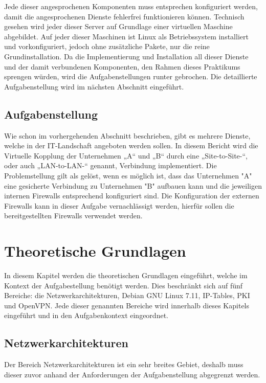 \documentclass[
a4paper,     %
 headsepline, %
footsepline, %
titlepage,   %
 halfparskip,     %
 fleqn,       %
12pt         %
]{scrartcl}  %
\begin{document}
Jede dieser angesprochenen Komponenten muss entsprechen konfiguriert werden, damit die angesprochenen Dienste fehlerfrei funktionieren können.
Technisch gesehen wird jeder dieser Server auf Grundlage einer virtuellen Maschine abgebildet.
Auf jeder dieser Maschinen ist Linux als Betriebssystem installiert und vorkonfiguriert, jedoch ohne zusätzliche Pakete, nur die reine Grundinstallation. Da die Implementierung und Installation all dieser Dienste und der damit verbundenen Komponenten, den Rahmen dieses Praktikums sprengen würden, wird die Aufgabenstellungen runter gebrochen. Die detaillierte Aufgabenstellung wird im nächsten Abschnitt eingeführt.

\subsection{Aufgabenstellung}\label{kap:Aufgabenstellung}
Wie schon im vorhergehenden Abschnitt beschrieben, gibt es mehrere Dienste, welche in der IT-Landschaft angeboten werden sollen. 
In diesem Bericht wird die Virtuelle Kopplung der Unternehmen „A“ und „B“ durch eine „Site-to-Site-“, oder auch „LAN-to-LAN-“ genannt, Verbindung implementiert. 
Die Problemstellung gilt als gelöst, wenn es möglich ist, dass das Unternehmen "A" eine gesicherte Verbindung zu Unternehmen "B" aufbauen kann und die jeweiligen internen Firewalls entsprechend konfiguriert sind. Die Konfiguration der externen Firewalls kann in dieser Aufgabe vernachlässigt werden, hierfür sollen die bereitgestellten Firewalls verwendet werden. 

\section{Theoretische Grundlagen}
In diesem Kapitel werden die theoretischen Grundlagen eingeführt, welche im Kontext der Aufgabestellung benötigt werden. Dies beschränkt sich auf fünf Bereiche: die Netzwerkarchitekturen, Debian GNU Linux 7.11, IP-Tables, PKI und OpenVPN. Jede dieser genannten Bereiche wird innerhalb dieses Kapitels eingeführt und in den Aufgabenkontext eingeordnet. 
\subsection{Netzwerkarchitekturen}
Der Bereich Netzwerkarchitekturen ist ein sehr breites Gebiet, deshalb muss dieser zuvor anhand der Anforderungen der Aufgabenstellung abgegrenzt werden.
\end{document}
